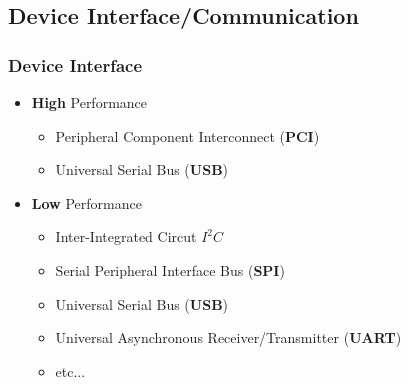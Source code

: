 \subsection{Device Interface/Communication}

\begin{frame}
  \frametitle{Device Interface}
  \begin{itemize}
    \item {\bf High} Performance
    \begin{itemize}
      \item Peripheral Component Interconnect ({\bf PCI})
      \item Universal Serial Bus ({\bf USB})
    \end{itemize}
    \item {\bf Low} Performance
    \begin{itemize}
      \item Inter-Integrated Circut {\bf $I^{2}C$}
      \item Serial Peripheral Interface Bus ({\bf SPI})
      \item Universal Serial Bus ({\bf USB})
      \item Universal Asynchronous Receiver/Transmitter ({\bf UART})
      \item etc...
    \end{itemize}
  \end{itemize}
\end{frame}
